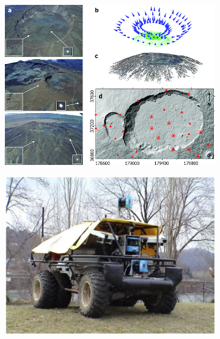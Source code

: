 \begin{figure}[h]
\centering
\begin{subfigure}{0.4\linewidth}
\includegraphics[width=\linewidth]{img/application_geoscience.png}
\caption{}
\end{subfigure}
%
\begin{subfigure}{0.4\linewidth}
\centering
\includegraphics[width=\linewidth]{img/application_autonomousdriving.png}
\caption{}
\end{subfigure}
%
\begin{subfigure}{0.4\linewidth}
\centering

\end{subfigure}
\end{figure}
